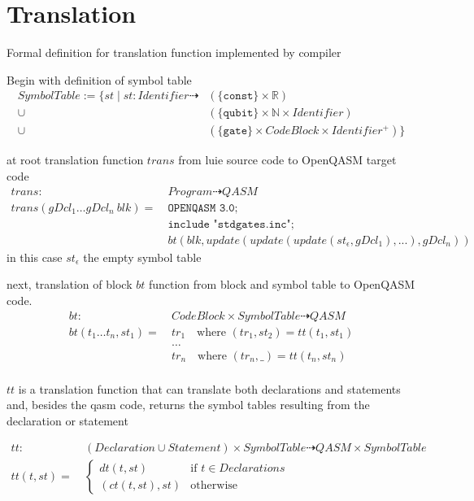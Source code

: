 \section{Translation}
\label{sec:concept_translation}
Formal definition for translation function implemented by compiler

Begin with definition of symbol table
\begin{align*}
    SymbolTable := \{st \mid st : Identifier \dashrightarrow &(\{\texttt{const}\} \times \mathbb{R})\\
                                                    \cup    &(\{\texttt{qubit}\} \times \mathbb{N} \times Identifier)\\
                                                    \cup    &(\{\texttt{gate}\} \times CodeBlock \times Identifier^+)
                                                    \}
\end{align*}

at root translation function $trans$ from luie source code to OpenQASM target code
\begin{align*}
    trans : \ & Program \dashrightarrow QASM\\
    trans(gDcl_1 \dots gDcl_n \ blk) = \ & \texttt{OPENQASM 3.0;}\\
                & \texttt{include "stdgates.inc";}\\
                & bt(blk, update(update(update(st_\epsilon, gDcl_1), ...), gDcl_n))
\end{align*}  
in this case $st_\epsilon$ the empty symbol table

next, translation of block $bt$ function from block and symbol table to OpenQASM code.  
\begin{align*}
    bt : \ & CodeBlock \times SymbolTable \dashrightarrow QASM\\
    bt(t_1 \dots t_n, st_1) = \ &  tr_1 \quad \text{where } (tr_1, st_2) = tt(t_1, st_1)\\
    & \dots\\
    & tr_n \quad \text{where } (tr_n, \_) = tt(t_n, st_n)\\
\end{align*}

$tt$ is a translation function that can translate both declarations and statements and, besides the qasm code, returns the symbol tables resulting from the declaration or statement

\begin{align*}
    tt : \ & (Declaration \cup Statement) \times SymbolTable \dashrightarrow QASM \times SymbolTable\\
    tt(t, st) = \ & \begin{cases}
        dt(t, st)  \quad &\text{if } t \in Declarations\\
        (ct(t, st), st) &\text{otherwise }
    \end{cases}  
\end{align*}

